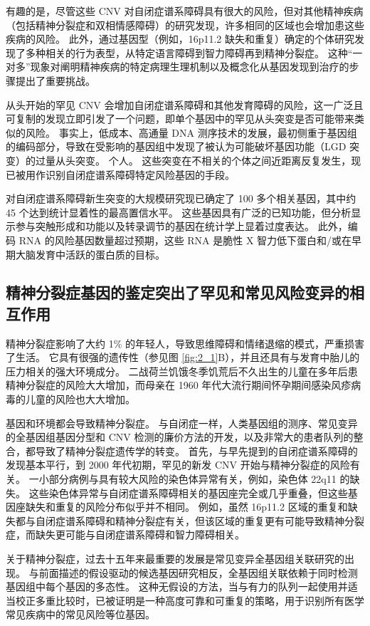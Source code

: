 有趣的是，尽管这些 CNV 对自闭症谱系障碍具有很大的风险，但对其他精神疾病（包括精神分裂症和双相情感障碍）的研究发现，许多相同的区域也会增加患这些疾病的风险。 
此外，通过基因型（例如，16p11.2 缺失和重复）确定的个体研究发现了多种相关的行为表型，从特定语言障碍到智力障碍再到精神分裂症。 
这种“一对多”现象对阐明精神疾病的特定病理生理机制以及概念化从基因发现到治疗的步骤提出了重要挑战。


从头开始的罕见 CNV 会增加自闭症谱系障碍和其他发育障碍的风险，这一广泛且可复制的发现立即引发了一个问题，即单个基因中的罕见从头突变是否可能带来类似的风险。 
事实上，低成本、高通量 DNA 测序技术的发展，最初侧重于基因组的编码部分，导致在受影响的基因组中发现了被认为可能破坏基因功能（LGD 突变）的过量从头突变。 
个人。 这些突变在不相关的个体之间近距离反复发生，现已被用作识别自闭症谱系障碍特定风险基因的手段。


对自闭症谱系障碍新生突变的大规模研究现已确定了 100 多个相关基因，其中约 45 个达到统计显着性的最高置信水平。 
这些基因具有广泛的已知功能，但分析显示参与突触形成和功能以及转录调节的基因在统计学上显着过度表达。 
此外，编码 RNA 的风险基因数量超过预期，这些 RNA 是脆性 X 智力低下蛋白和/或在早期大脑发育中活跃的蛋白质的目标。


\subsection{精神分裂症基因的鉴定突出了罕见和常见风险变异的相互作用}

精神分裂症影响了大约 1\% 的年轻人，导致思维障碍和情绪退缩的模式，严重损害了生活。 
它具有很强的遗传性（参见图 \ref{fig:2_1}B），并且还具有与发育中胎儿的压力相关的强大环境成分。 
二战荷兰饥饿冬季饥荒后不久出生的儿童在多年后患精神分裂症的风险大大增加，而母亲在 1960 年代大流行期间怀孕期间感染风疹病毒的儿童的风险也大大增加。


基因和环境都会导致精神分裂症。 
与自闭症一样，人类基因组的测序、常见变异的全基因组基因分型和 CNV 检测的廉价方法的开发，以及非常大的患者队列的整合，都导致了精神分裂症遗传学的转变。 
首先，与早先提到的自闭症谱系障碍的发现基本平行，到 2000 年代初期，罕见的新发 CNV 开始与精神分裂症的风险有关。 
一小部分病例与具有较大风险的染色体异常有关，例如，染色体 22q11 的缺失。 
这些染色体异常与自闭症谱系障碍相关的基因座完全或几乎重叠，但这些基因座缺失和重复的风险分布似乎并不相同。 
例如，虽然 16p11.2 区域的重复和缺失都与自闭症谱系障碍和精神分裂症有关，但该区域的重复更有可能导致精神分裂症，而缺失更可能与自闭症谱系障碍和智力障碍相关。


关于精神分裂症，过去十五年来最重要的发展是常见变异全基因组关联研究的出现。 
与前面描述的假设驱动的候选基因研究相反，全基因组关联依赖于同时检测基因组中每个基因的多态性。 
这种无假设的方法，当与有力的队列一起使用并适当校正多重比较时，已被证明是一种高度可靠和可重复的策略，用于识别所有医学常见疾病中的常见风险等位基因。


